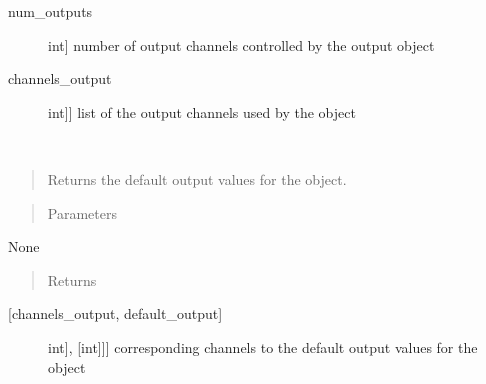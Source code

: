 \documentclass[letterpaper,10pt,english]{sphinxmanual}
\begin{document}
\begin{fulllineitems}
\begin{fulllineitems}
\begin{description}
\item[{num\_outputs}] \leavevmode{[}int{]}
\sphinxAtStartPar
number of output channels controlled by the output object

\item[{channels\_output}] \leavevmode{[}{[}int{]}{]}
\sphinxAtStartPar
list of the output channels used by the object

\end{description}

\end{fulllineitems}


\begin{fulllineitems}
\label{\detokenize{generic:AnalogOutputObject.AnalogOutputObject.get_default_outputs}}~\begin{quote}

\sphinxAtStartPar
Returns the default output values for the object.
\end{quote}
\begin{quote}\begin{description}
\item[{Parameters}] \leavevmode
\end{description}\end{quote}

\sphinxAtStartPar
None
\begin{quote}\begin{description}
\item[{Returns}] \leavevmode
\end{description}\end{quote}
\begin{description}
\item[{{[}channels\_output, default\_output{]}}] \leavevmode{[}{[}{[}int{]}, {[}int{]}{]}{]}
\sphinxAtStartPar
corresponding channels to the default output values for the object

\end{description}

\end{fulllineitems}



\end{fulllineitems}
\end{document}
